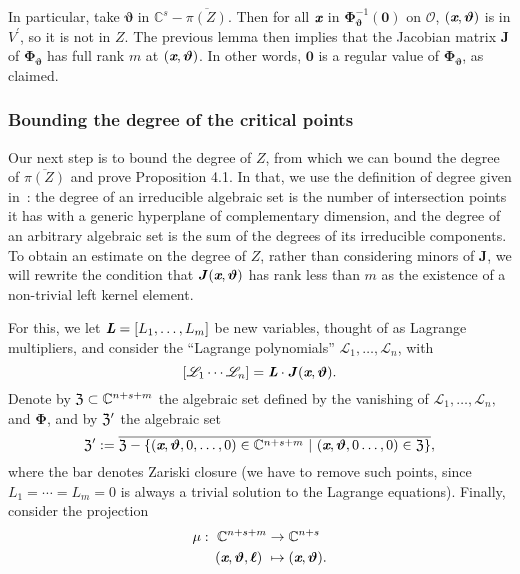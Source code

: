 \documentclass[a4paper]{article}
\def\sO{\mathscr{O}}
\def\thetab{\bm{\vartheta}}
\def\xb{\textit{\textbf{x}}}
\def\dt{s}
\def\C{\mathbb{C}}
\begin{document}
    In particular, take $\thetab$ in $\C^\dt - \overline{\pi(Z)}$.
    Then for all $\xb$ in $\bm \Phi_{\thetab}^{-1}(\bm 0)$ on $\sO$, $(\xb,\thetab)$
    is in $V^{'}$, so it is not in $Z$. The previous lemma then implies that
    the Jacobian matrix $\bm J$ of $\bm\Phi_{\thetab}$ has full rank $m$ at
    $(\xb,\thetab)$. In other words, $\bm 0$ is a regular value of $\bm
    \Phi_{\thetab}$, as claimed.
    
    
    
    \subsubsection{Bounding the degree of the critical points}
    Our next step is to bound the degree of $Z$, from which we can bound the degree of $\overline{\pi(Z)}$ and prove Proposition 4.1.  In that, we use the
    definition of degree given in~\cite{H}: the degree of an irreducible
    algebraic set is the number of intersection points it has with a
    generic hyperplane of complementary dimension, and the degree of an
    arbitrary algebraic set is the sum of the degrees of its irreducible
    components.  To obtain an estimate on the degree of $Z$, rather than
    considering minors of $\bm J$, we will rewrite the condition that $\bm
    J(\xb,\thetab)$ has rank less than $m$ as the existence of a
    non-trivial left kernel element.
    
       For this, we let $\textit{\textbf{L}}=[L_1,\hdots,L_m]$ be new
    variables, thought of as Lagrange multipliers, and consider the
    ``Lagrange polynomials'' $\mathscr{L}_1,\dots,\mathscr{L}_{n}$, with
    \[
    [\mathscr{L}_1 \cdots \mathscr{L}_{n}]=\textit{\textbf{L}}\cdot \bm J(\xb,\thetab).
    \] 
    Denote by $\frak{Z} \subset \C^{n+\dt+m}$ the algebraic set defined by
    the vanishing of $\mathscr{L}_1,\hdots,\mathscr{L}_{n},$ and
    $\bm\Phi$, and by $\frak{Z}'$ the algebraic set
    \[
    \frak{Z}' := \overline{\frak{Z} - \{(\xb,\thetab,0,\hdots,0) \in \C^{n+\dt+m}~|~(\xb,\thetab,0\hdots,0) \in \frak{Z}\}},
    \]
    where the bar denotes Zariski closure (we have to remove such points,
    since $L_1=\cdots=L_m=0$ is always a trivial solution to the Lagrange
    equations). Finally, consider the projection
    \begin{align*} 
    \mu :~ \C^{n+\dt+m} &\rightarrow \C^{n+\dt}\\
    (\xb,\thetab,\bm \ell)~ &\mapsto (\xb,\thetab).
    \end{align*}
    
\end{document}
